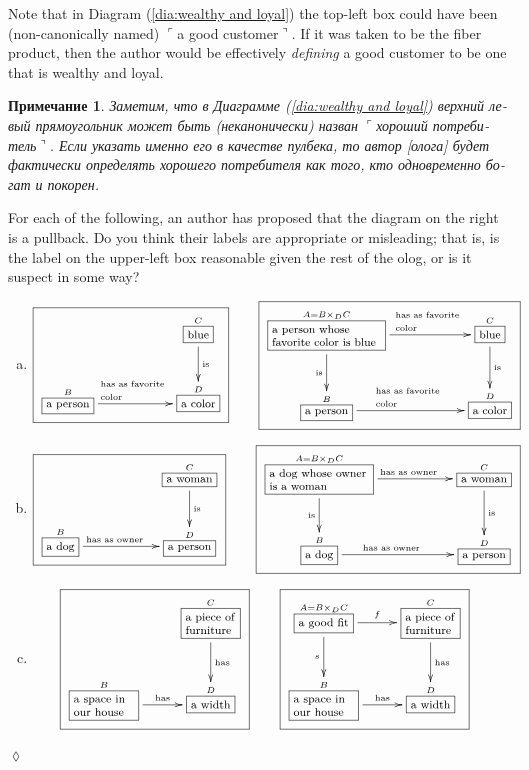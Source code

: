 \documentclass[a4paper]{book}
\def\tn{\textnormal}
\def\hsp{\hspace{.3in}}
\def\rr{\raggedright}
\newcommand{\LA}[2]{\ar[#1]^-{\tn {#2}}}
\newcommand{\LAL}[2]{\ar[#1]_-{\tn {#2}}}
\newcommand{\obox}[3]{\stackrel{#1}{\fbox{\parbox{#2}{#3}}}}
\newcommand{\smbox}[2]{\stackrel{#1}{\fbox{#2}}}
\newcommand{\fakebox}[1]{\tn{$\ulcorner$#1$\urcorner$}}
\theoremstyle{myth}
\newtheorem{remarkENG}[envENG]{\begin{english}Remark\end{english}}
\newtheorem{excENG}[envENG]{\begin{english}Exercise\end{english}}
\newenvironment{exerciseENG}{\begin{excENG}}{\hspace*{\fill}$\lozenge$\end{excENG}}
\newtheorem{remarkRUS}[envRUS]{Примечание}
\def\sexc{\begin{enumerate}[a.)]\setlength{\itemsep}{.1cm}\setlength{\parskip}{.1cm}\item}
\def\next{\item}
\def\endsexc{\end{enumerate}}
\begin{document}
\begin{russian}
\begin{remarkENG}\label{rem:defining using pullbacks}
Note that in Diagram (\ref{dia:wealthy and loyal}) the top-left box could have been (non-canonically named) \fakebox{a good customer}. If it was taken to be the fiber product, then the author would be effectively {\em defining} a good customer to be one that is wealthy and loyal. 
\end{remarkENG}

\begin{remarkRUS}\label{rem:defining using pullbacks}
Заметим, что в Диаграмме (\ref{dia:wealthy and loyal}) верхний левый прямоугольник может быть (неканонически) назван \fakebox{хороший потребитель}. Если указать именно его в качестве пулбека, то автор [олога] будет фактически {\em определять} хорошего потребителя как того, кто одновременно богат и покорен. 
\end{remarkRUS}

\begin{exerciseENG}
For each of the following, an author has proposed that the diagram on the right is a pullback. Do you think their labels are appropriate or misleading; that is, is the label on the upper-left box reasonable given the rest of the olog, or is it suspect in some way?
\sexc\begin{align*}\footnotesize\fbox{\xymatrix{&&\smbox{C}{blue}\LA{d}{is}\\\smbox{B}{a person}\LA{rr}{\parbox{.7in}{\rr has as favorite color}}&&\smbox{D}{a color}}}\hsp&\footnotesize\fbox{\xymatrixnocompile{\obox{A=B\times_DC}{1.1in}{\rr a person whose favorite color is blue}\LAL{d}{is}\LA{rr}{\parbox{.7in}{\rr has as favorite color}}&&\smbox{C}{blue}\LA{d}{is}\\\smbox{B}{a person}\LA{rr}{\parbox{.7in}{\rr has as favorite color}}&&\smbox{D}{a color}}}
\end{align*}
\next\begin{align*}\footnotesize\fbox{\xymatrixnocompile{&&\smbox{C}{a woman}\LA{d}{is}\\\smbox{B}{a dog}\LA{rr}{\parbox{.7in}{\rr has as owner}}&&\smbox{D}{a person}}}\hsp&\footnotesize\fbox{\xymatrixnocompile{\obox{A=B\times_DC}{1in}{\rr a dog whose owner is a woman}\LAL{d}{is}\LA{rr}{\parbox{.7in}{\rr has as owner}}&&\smbox{C}{a woman}\LA{d}{is}\\\smbox{B}{a dog}\LA{rr}{\parbox{.7in}{\rr has as owner}}&&\smbox{D}{a person}}}
\end{align*}
\next\begin{align*}\footnotesize\fbox{\xymatrixnocompile{&\obox{C}{.5in}{\rr a piece of furniture}\LA{d}{has}\\\obox{B}{.6in}{\rr a space in our house}\LA{r}{has}&\smbox{D}{a width}}}\hsp&\footnotesize\fbox{\xymatrixnocompile{\obox{A=B\times_DC}{.5in}{\rr a good fit}\LAL{d}{$s$}\LA{r}{$f$}&\obox{C}{.5in}{\rr a piece of furniture}\LA{d}{has}\\\obox{B}{.6in}{\rr a space in our house}\LA{r}{has}&\smbox{D}{a width}}}
\end{align*}
\endsexc
\end{exerciseENG}


\end{russian}
\end{document}
